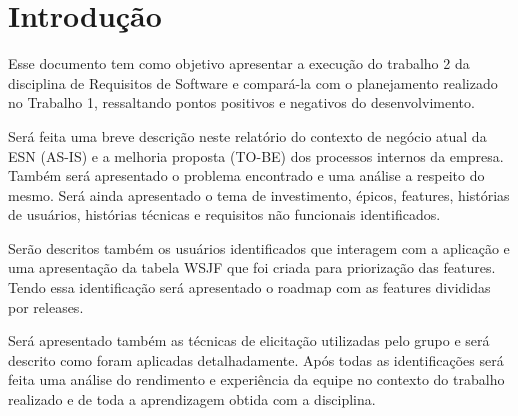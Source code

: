\section{Introdução}
	Esse documento tem como objetivo apresentar a execução do trabalho 2 da disciplina de Requisitos de Software e compará-la com o planejamento realizado no Trabalho 1, ressaltando pontos positivos e negativos do desenvolvimento.

	Será feita uma breve descrição neste relatório do contexto de negócio atual da ESN (AS-IS) e a melhoria proposta (TO-BE) dos processos internos da empresa. Também será apresentado o problema encontrado e uma análise a respeito do mesmo. Será ainda apresentado o tema de investimento, épicos, features, histórias de usuários, histórias técnicas e requisitos não funcionais identificados.

	Serão descritos também os usuários identificados que interagem com a aplicação e uma apresentação da tabela WSJF que foi criada para priorização das features. Tendo essa identificação será apresentado o roadmap com as features divididas por releases.

	Será apresentado também as técnicas de elicitação utilizadas pelo grupo e será descrito como foram aplicadas detalhadamente.
	Após todas as identificações será feita uma análise do rendimento e experiência da equipe no contexto do trabalho realizado e de toda a aprendizagem obtida com a disciplina.